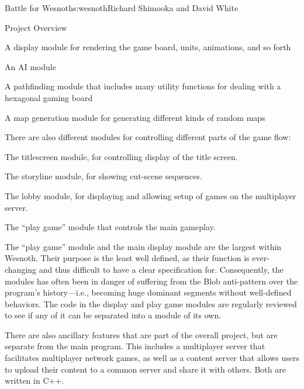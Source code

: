 \begin{aosachapter}{Battle for Wesnoth}{s:wesnoth}{Richard Shimooka and David White}
\begin{aosasect1}{Project Overview}
\begin{aosaitemize}
  \item A display module for rendering the game board, units,
  animations, and so forth

  \item An AI module

  \item A pathfinding module that includes many utility functions for
  dealing with a hexagonal gaming board

  \item A map generation module for generating different kinds of
  random maps

\end{aosaitemize}

There are also different modules for controlling different parts of
the game flow:

\begin{aosaitemize}

  \item The titlescreen module, for controlling display of the
  title screen.

  \item The storyline module, for showing cut-scene sequences.

  \item The lobby module, for displaying and allowing setup of games
  on the multiplayer server.

  \item The ``play game'' module that controls the main gameplay.

\end{aosaitemize}

The ``play game'' module and the main display module are the largest
within Wesnoth.  Their purpose is the least well defined, as their
function is ever-changing and thus difficult to have a clear
specification for. Consequently, the modules has often been in danger
of suffering from the Blob anti-pattern over the program's
history---i.e., becoming huge dominant segments without well-defined
behaviors.  The code in the display and play game modules are
regularly reviewed to see if any of it can be separated into a module
of its own.

There are also ancillary features that are part of the overall
project, but are separate from the main program. This includes a
multiplayer server that facilitates multiplayer network games, as well
as a content server that allows users to upload their content to a
common server and share it with others. Both are written in C++.


\end{aosasect1}
\end{aosachapter}
